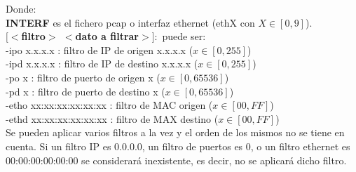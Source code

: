 \documentclass[a4paper, 11pt]{article}	%
\begin{document}
\noindent Donde:\\
\textbf{INTERF} es el fichero pcap o interfaz ethernet (ethX con $X \in [0,9]$).\\
\textbf{$[<$filtro$>$ $<$dato a filtrar$>]:$} puede ser:\\
\indent -ipo x.x.x.x : filtro de IP de origen x.x.x.x ($x \in [0, 255]$)\\
\indent -ipd x.x.x.x : filtro de IP de destino x.x.x.x ($x \in [0, 255]$)\\
\indent -po x : filtro de puerto de origen x ($x \in [0,65536]$)\\
\indent -pd x : filtro de puerto de destino x ($x \in [0,65536]$)\\
\indent -etho xx:xx:xx:xx:xx:xx : filtro de MAC origen ($x \in [00,FF]$)\\
\indent -ethd xx:xx:xx:xx:xx:xx : filtro de MAX destino ($x \in [00,FF]$)\\

Se pueden aplicar varios filtros a la vez y el orden de los mismos no se tiene en cuenta.
Si un filtro IP es 0.0.0.0, un filtro de puertos es 0, o un filtro ethernet es 00:00:00:00:00:00 se considerará inexistente, es decir, no se aplicará dicho filtro.
\end{document}
